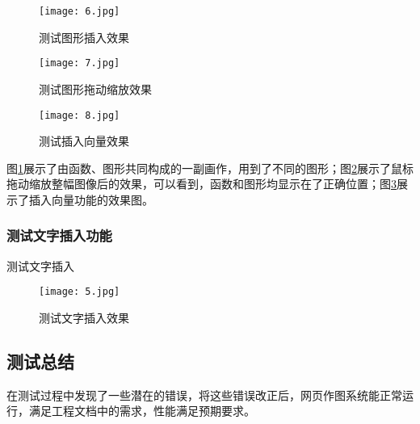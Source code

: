 \documentclass[lang=cn]{elegantpaper}
\begin{document}
\begin{figure}[htbp]
	\centering
	\texttt{[image: 6.jpg]}
	\caption{测试图形插入效果}
	\label{6img}
\end{figure}

\begin{figure}[htbp]
	\centering
	\texttt{[image: 7.jpg]}
	\caption{测试图形拖动缩放效果}
	\label{7img}
\end{figure}

\begin{figure}[htbp]
	\centering
	\texttt{[image: 8.jpg]}
	\caption{测试插入向量效果}
	\label{8img}
\end{figure}

图\ref{6img}展示了由函数、图形共同构成的一副画作，用到了不同的图形；图\ref{7img}展示了鼠标拖动缩放整幅图像后的效果，可以看到，函数和图形均显示在了正确位置；图\ref{8img}展示了插入向量功能的效果图。

\subsubsection{测试文字插入功能}

\makeatletter{}\makeatother
	\small
	\caption{测试文字插入}  
	\begin{center}  
	\end{center}  

\begin{figure}[htbp]
	\centering
	\texttt{[image: 5.jpg]}
	\caption{测试文字插入效果}
	\label{5img}
\end{figure}

\subsection{测试总结}

在测试过程中发现了一些潜在的错误，将这些错误改正后，网页作图系统能正常运行，满足工程文档中的需求，性能满足预期要求。
\end{document}

